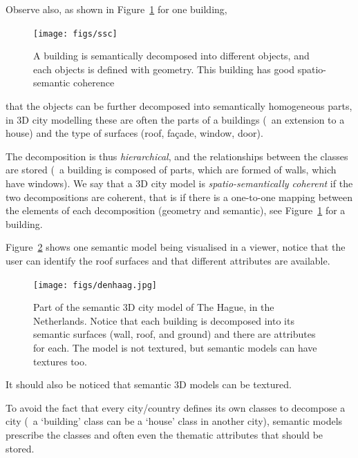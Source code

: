 %

Observe also, as shown in Figure~\ref{fig:ssc} for one building, 
\begin{figure}
  \centering
  \texttt{[image: figs/ssc]}
  \caption{A building is semantically decomposed into different objects, and each objects is defined with geometry. This building has good spatio-semantic coherence}%
\label{fig:ssc}
\end{figure}
that the objects can be further decomposed into semantically homogeneous parts, in 3D city modelling these are often the parts of a buildings (\eg\ an extension to a house) and the type of surfaces (roof, façade, window, door).

The decomposition is thus \emph{hierarchical}, 
and the relationships between the classes are stored (\eg\ a building is composed of parts, which are formed of walls, which have windows). 
We say that a 3D city model is \emph{spatio-semantically coherent} if the two decompositions are coherent,
that is if there is a one-to-one mapping between the elements of each decomposition (geometry and semantic), see Figure~\ref{fig:ssc} for a building.

%

Figure~\ref{fig:denhaag} shows one semantic model being visualised in a viewer, notice that the user can identify the roof surfaces and that different attributes are available.
\begin{figure}
  \centering
  \texttt{[image: figs/denhaag.jpg]}
  \caption{Part of the semantic 3D city model of The Hague, in the Netherlands. Notice that each building is decomposed into its semantic surfaces (wall, roof, and ground) and there are attributes for each. The model is not textured, but semantic models can have textures too.}%
\label{fig:denhaag}
\end{figure}

%

It should also be noticed that semantic 3D models can be textured.

%

To avoid the fact that every city/country defines its own classes to decompose a city (\eg\ a `building' class can be a `house' class in another city), semantic models prescribe the classes and often even the thematic attributes that should be stored.


